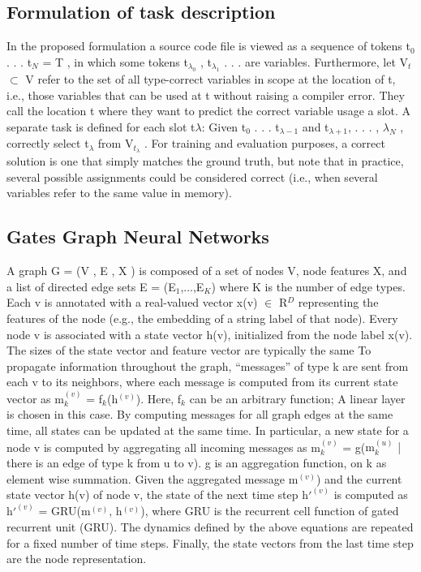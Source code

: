 \documentclass{article}
\begin{document}
\subsection{Formulation of task description}
In the proposed formulation a source code file is viewed as a sequence of tokens t$_0$ . . . t$_N$ = T , in which some tokens t$_{\lambda_0}$ , t$_{\lambda_1}$ . . . are variables. Furthermore, let V$_t$ $\subset$ V refer to the set of all type-correct variables in scope at the location of t, i.e., those variables that can be used at t without raising a compiler error. They call the location t where they want to predict the correct variable usage a slot. A separate task is defined for each slot t$\lambda$: Given t$_0$ . . . t$_{\lambda-1}$ and t$_{\lambda+1}$, . . . , $\lambda_N$ , correctly select t$_\lambda$ from V$_{t_\lambda}$ . For training and evaluation purposes, a correct solution is one that simply matches the ground truth, but note that in practice, several possible assignments could be considered correct (i.e., when several variables refer to the same value in memory).

\subsection{Gates Graph Neural Networks}
A graph G = (V , E , X ) is composed of a set of nodes V, node features X, and a list of directed edge sets E = (E$_1$,...,E$_K$) where K is the number of edge types. Each v is annotated with a real-valued vector x(v) $\in$ R$^D$ representing the features of the node (e.g., the embedding of a string label of that node). Every node v is associated with a state vector h(v), initialized from the node label x(v). The sizes of the state vector and feature vector are typically the same To propagate information throughout the graph, “messages” of type k are sent from each v to its neighbors, where each message is computed from its current state vector as m$_k^{(v)}$ = f$_k$(h$^{(v)}$). Here, f$_k$ can be an arbitrary function; A linear layer is chosen in this case. By computing messages for all graph edges at the same time, all states can be updated at the same time. In particular, a  new state for a node v is computed by aggregating all incoming messages as m$_k^{(v)}$ = g({m$_k^{(u)}$ | there is an edge of type k from u to v}). g is an aggregation function, on k as element wise summation. Given the aggregated message m$^{(v)}$) and the current state vector h(v) of node v, the state of the next time step h$'^{(v)}$ is computed as h$'^{(v)}$ = GRU(m$^{(v)}$, h$^{(v)}$), where GRU is the recurrent cell function of gated recurrent unit (GRU). The dynamics defined by the above equations are repeated for a fixed number of time steps. Finally, the state vectors from the last time step are the node representation.
\end{document}
